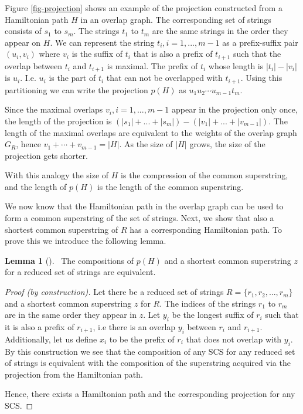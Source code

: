\documentclass[english,twoside,censored,csm,algorithms-track-2020]{HYthesisML}
\theoremstyle{plain}
\theoremstyle{definition}
\newtheorem{lemma}[theorem]{Lemma}
\begin{document}

Figure \ref{fig-projection} shows an example of the projection constructed from a
Hamiltonian path $H$ in an overlap graph. The corresponding set of
strings consists of $s_1$ to $s_m$.
The strings $t_1$ to $t_m$ are the same strings in the order they appear on $H$.
We can represent the string $t_i, i=1,...,m-1$ as a prefix-suffix pair
$(u_i,v_i)$ where $v_i$ is the suffix of $t_i$ that is also a prefix of $t_{i+1}$ such that the
overlap between $t_i$ and $t_{i+1}$ is maximal. The prefix of $t_i$ whose length is $|t_i|-|v_i|$ is
$u_i$. I.e. $u_i$ is the part of $t_i$ that can not be overlapped with $t_{i+1}$. Using this
partitioning we can write the projection $p(H)$ as $u_1u_2\cdots u_{m-1}t_m$.

Since the maximal overlaps $v_i,i=1,...,m-1$ appear in the projection only once, the length of the
projection is $(|s_1|+...+|s_m|) - (|v_1|+...+|v_{m-1}|)$. The length of the maximal overlaps
are equivalent to the weights of the overlap graph $G_R$, hence $v_1+\cdots +v_{m-1} = |H|$. As the size
of $|H|$ grows, the size of the projection gets shorter.


With this analogy the size of $H$ is the compression of the common superstring,
and the length of $p(H)$ is the length of the common superstring.

We now know that the Hamiltonian path in the overlap graph can be used to form a common superstring
of the set of strings. Next, we show that also a shortest common superstring of $R$ has a
corresponding Hamiltonian path. To prove this we introduce the following lemma.


\begin{lemma}[]~\label{lem-composition}
The compositions of $p(H)$ and a shortest common superstring $z$ for a reduced set of strings are equivalent.
\end{lemma}
\begin{proof}[Proof (by construction)]
  Let there be a reduced set of strings $R=\{r_1,r_2,...,r_m\}$ and
  a shortest common superstring $z$ for $R$. The indices of the strings $r_1$ to $r_m$ are in the same
  order they appear in $z$. Let $y_i$ be the longest suffix of $r_i$ such that it is also a prefix
  of $r_{i+1}$, i.e there is an overlap $y_i$ between $r_i$ and $r_{i+1}$. Additionally, let us
  define $x_i$ to be the prefix of $r_i$ that does not overlap with $y_i$. By this construction we
  see that the composition of any SCS for any reduced set of strings is equivalent with the composition
  of the superstring acquired via the projection from the Hamiltonian path.

  Hence, there exists a
  Hamiltonian path and the corresponding projection for any SCS.
\end{proof}
\end{document}
